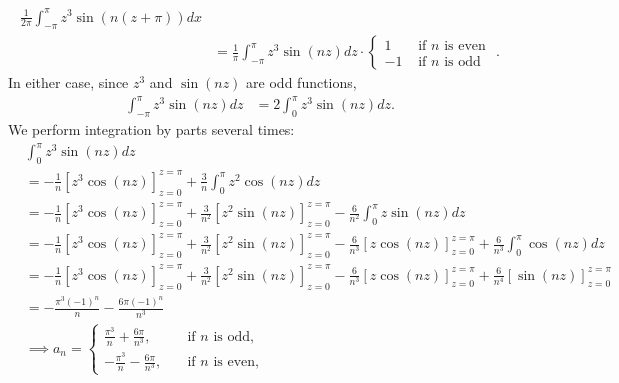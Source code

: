 \documentclass[11pt]{article}
\begin{document}
\begin{solution}
\begin{itemize}
\begin{align*}
        \frac{1}{2\pi} \int_{-\pi}^{\pi} z^{3} \sin(n(z+\pi)) dx
        \\&=
        \frac{1}{\pi} \int_{-\pi}^{\pi} z^{3} \sin(nz) dz
        \cdot \left\{\begin{array}{ll} 1 & \text{ if $n$ is even } \\ -1 & \text{ if $n$ is odd } \end{array}\right.
        .
    \end{align*}
    In either case, since $z^3$ and $\sin(nz)$ are odd functions,
    \begin{align*}
        \int_{-\pi}^{\pi} z^{3} \sin(nz) dz
        &=
        2\int_{0}^{\pi} z^{3} \sin(nz) dz
        .
    \end{align*}
    We perform integration by parts several times:
    \begin{align*}
        &
        \int_{0}^{\pi} z^{3} \sin(nz) dz
        \\&=
        -
        \frac 1 {n} 
        \left[ z^{3} \cos(nz) \right]_{z=0}^{z=\pi}
        +
        \frac 3 {n}
        \int_{0}^{\pi} z^{2} \cos(nz) dz
        \\&=
        -
        \frac 1 {n} 
        \left[ z^{3} \cos(nz) \right]_{z=0}^{z=\pi}
        +
        \frac 3 {n^2} 
        \left[ z^{2} \sin(nz) \right]_{z=0}^{z=\pi}
        -
        \frac 6 {n^2} 
        \int_{0}^{\pi} z \sin(nz) dz
        \\&=
        - \frac 1 {n} 
        \left[ z^{3} \cos(nz) \right]_{z=0}^{z=\pi}
        + 
        \frac 3 {n^2}
        \left[ z^{2} \sin(nz) \right]_{z=0}^{z=\pi}
        -
        \frac 6 {n^3} 
        \left[ z \cos(nz) \right]_{z=0}^{z=\pi}
        +
        \frac 6 {n^3} 
        \int_{0}^{\pi} \cos(nz) dz
        \\&=
        - \frac 1 {n} 
        \left[ z^{3} \cos(nz) \right]_{z=0}^{z=\pi}
        + 
        \frac 3 {n^2}
        \left[ z^{2} \sin(nz) \right]_{z=0}^{z=\pi}
        -
        \frac 6 {n^3} 
        \left[ z \cos(nz) \right]_{z=0}^{z=\pi}
        +
        \frac 6 {n^4} 
        \left[ \sin(nz) \right]_{z=0}^{z=\pi}
        \\&=
	-\frac{\pi^3(-1)^n}{n}-\frac{6\pi(-1)^n}{n^3} 
	\\&\implies
            a_n = 
            \begin{cases}
            \frac{\pi^3}{n}+\frac{6\pi}{n^3}  ,\quad &\text{if } n\text{ is odd,}\\
            -\frac{\pi^3}{n}-\frac{6\pi}{n^3}   ,\quad &\text{if } n\text{ is even,}

\end{cases}
\end{align*}
\end{itemize}
\end{solution}
\end{document}
